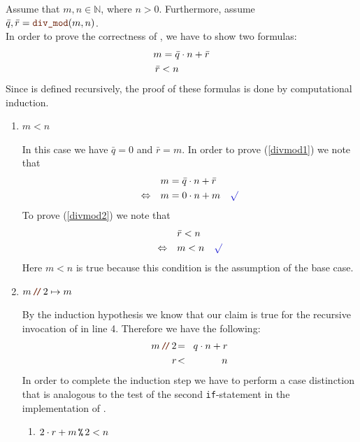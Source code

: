\proof
Assume that $m,n \in \mathbb{N}$, where $n > 0$.  Furthermore, assume
\\[0.2cm]
\hspace*{1.3cm}
$\bar{q}, \bar{r} = \mytt{div\_mod}(m, n)$.
\\[0.2cm] 
In order to prove the correctness of , we have to show two formulas:
\begin{align}
m = \bar{q} \cdot n + \bar{r} \label{divmod1} \\
\bar{r} < n \hspace*{1.1cm} \label{divmod2}
\end{align}
Since  is defined recursively, the proof of these formulas is done by computational induction.
\begin{enumerate}
\item[B.C.:] $m < n$

  In this case we have $\bar{q} = 0$ and $\bar{r} = m$.
  In order to prove (\ref{divmod1}) we note that 
  \begin{align*}
                    & m = \bar{q} \cdot n + \bar{r} \\
    \Leftrightarrow\quad & m = 0 \cdot n + m \quad \green{\surd}
  \end{align*}
  To prove (\ref{divmod2}) we note that
  \begin{align*}
                         & \bar{r} < n \\
    \Leftrightarrow\quad & m < n \quad\green{\surd}
  \end{align*}
  Here $m < n$ is true because this condition is the assumption of the base case.
\item[I.S.:] $m \dv 2 \mapsto m$

  By the induction hypothesis we know that our claim is true for the recursive invocation of  in
  line 4.  Therefore we have the following:
  \begin{eqnarray}
    m \dv 2 &\!=\! & q \cdot n + r \label{divmod3} \\
          r &\!<\! & n             \label{divmod4}
  \end{eqnarray}
  In order to complete the induction step we have to perform a case distinction that is analogous to the test
  of the second \texttt{if}-statement in the implementation of .
  \begin{enumerate}
  \item $2 \cdot r + m \,\texttt{\%}\, 2 < n$


\end{enumerate}
\end{enumerate}
